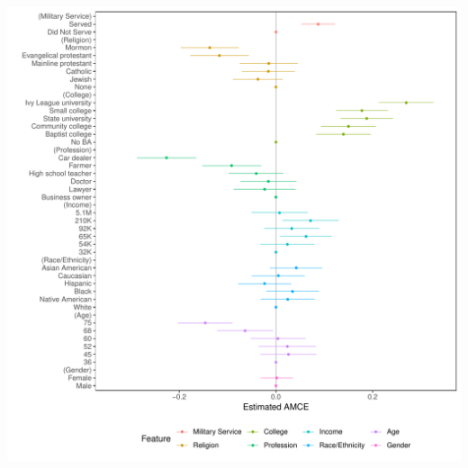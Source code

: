\documentclass[a4paper,12pt]{article}\usepackage[]{graphicx}\usepackage[]{color}
\makeatletter
\def\maxwidth{ %
  \ifdim\Gin@nat@width>\linewidth
    \linewidth
  \else
    \Gin@nat@width
  \fi
}
\newenvironment{knitrout}{}{} %
\makeatother
\begin{document}
\begin{knitrout}
\color{fgcolor}
\includegraphics[width=\maxwidth]{figure/hainmueller_candidate_amce_appendix-1} 

\end{knitrout}

\clearpage
\end{document}
